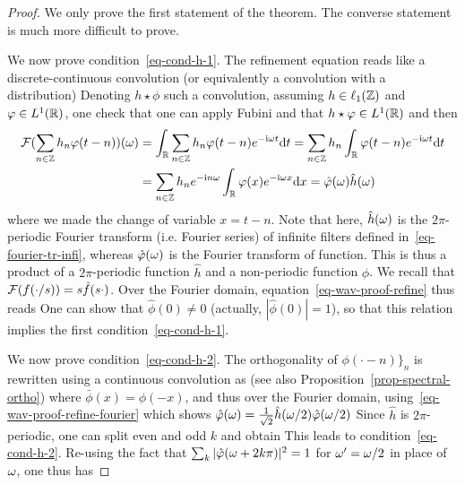 \begin{proof} We only prove the first statement of the theorem. The converse statement is much more difficult to prove.

We now prove condition~\eqref{eq-cond-h-1}.
%
The refinement equation reads like a discrete-continuous convolution (or equivalently a convolution with a distribution)
%
Denoting $h \star \phi$ such a convolution, assuming $h \in \ell_1(\mathbb{Z})$ and $\varphi \in L^1(\mathbb{R})$, one check that one can apply Fubini and that $h \star \varphi \in L^1(\mathbb{R})$ and then 
\begin{align*}
	\mathcal{F}( \sum_{n \in \mathbb{Z}} h_n \varphi(t-n) )(\omega) &= \int_{\mathbb{R}} \sum_{n \in \mathbb{Z}} h_n \varphi(t-n) e^{-\mathrm{i} \omega t} \mathrm{d} t
	= \sum_{n \in \mathbb{Z}} h_n \int_{\mathbb{R}} \varphi(t-n) e^{-\mathrm{i} \omega t} \mathrm{d} t \\
	& = \sum_{n \in \mathbb{Z}} h_n e^{-\mathrm{i} n \omega } \int_{\mathbb{R}} \varphi(x) e^{-\mathrm{i} \omega x} \mathrm{d} x
	= \hat {\varphi}(\omega) \hat h(\omega)
\end{align*}
where we made the change of variable $x = t-n$. Note that here, $\hat h(\omega)$ is the $2\pi$-periodic Fourier transform (i.e. Fourier series) of infinite filters defined in~\eqref{eq-fourier-tr-infi}, whereas $\hat{\varphi}(\omega)$ is the Fourier transform of function. This is thus a product of a $2\pi$-periodic function $\hat h$ and a non-periodic function $\hat \phi$. 
%
We recall that $\mathcal{F}(f(\cdot/s)) = s \hat f(s \cdot)$.
%
Over the Fourier domain, equation~\eqref{eq-wav-proof-refine} thus reads
One can show that $\hat \phi(0) \neq 0$ (actually, $|\hat \phi(0)| = 1$), so that this relation implies the first condition~\eqref{eq-cond-h-1}.


We now prove condition~\eqref{eq-cond-h-2}.
%
The orthogonality of $\phi(\cdot-n) \}_n$ is rewritten using a continuous convolution as (see also  Proposition~\ref{prop-spectral-ortho})
where $\bar \phi(x) = \phi(-x)$, 
and thus over the Fourier domain, using~\eqref{eq-wav-proof-refine-fourier} which shows $\hat{\varphi}(\omega) = \frac{1}{\sqrt{2}}\hat h(\omega/2) \hat {\varphi}(\omega/2)$
Since $\hat h$ is $2\pi$-periodic, one can split even and odd $k$ and obtain
This leads to condition~\eqref{eq-cond-h-2}. Re-using the fact that $\sum_k |\hat {\varphi}(\omega+2k\pi)|^2=1$ for $\omega'=\omega/2$ in place of $\omega$, one thus has 


\end{proof}
